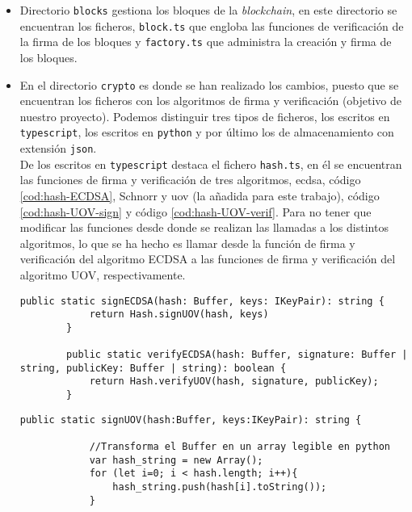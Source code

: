 \begin{itemize}
	\item Directorio \texttt{blocks} gestiona los bloques de la \textit{blockchain}, en este directorio se encuentran los ficheros, \texttt{block.ts} que engloba las funciones de verificación de la firma de los bloques y \texttt{factory.ts} que administra la creación y firma de los bloques.
	\item En el directorio \texttt{crypto} es donde se han realizado los cambios, puesto que se encuentran los ficheros con los algoritmos de firma y verificación (objetivo de nuestro proyecto). Podemos distinguir tres tipos de ficheros, los escritos en \texttt{typescript}, los escritos en \texttt{python} y por último los de almacenamiento con extensión \texttt{json}.\\
	
	De los escritos en \texttt{typescript} destaca el fichero \texttt{hash.ts}, en él se encuentran las funciones de firma y verificación de tres algoritmos, \acrshort{ecdsa}, código \ref{cod:hash-ECDSA}, Schnorr\cite{schnorr} y \acrshort{uov} (la añadida para este trabajo), código \ref{cod:hash-UOV-sign} y código \ref{cod:hash-UOV-verif}. Para no tener que modificar las funciones desde donde se realizan las llamadas a los distintos algoritmos, lo que se ha hecho es llamar desde la función de firma y verificación del algoritmo ECDSA a las funciones de firma y verificación del algoritmo UOV, respectivamente.\\
	
	\begin{lstlisting}[caption=Modificación archivo \texttt{hash.ts} funciones ECDSA, label=cod:hash-ECDSA, style=TypeScript]
		public static signECDSA(hash: Buffer, keys: IKeyPair): string {
			return Hash.signUOV(hash, keys)
		}

		public static verifyECDSA(hash: Buffer, signature: Buffer | string, publicKey: Buffer | string): boolean {
			return Hash.verifyUOV(hash, signature, publicKey);
		}
	\end{lstlisting}
	
	\begin{lstlisting}[caption=Modificación archivo \texttt{hash.ts} función \texttt{signUOV}, label=cod:hash-UOV-sign, style=TypeScript]
		public static signUOV(hash:Buffer, keys:IKeyPair): string {

			//Transforma el Buffer en un array legible en python
			var hash_string = new Array();
			for (let i=0; i < hash.length; i++){
				hash_string.push(hash[i].toString());
			}


\end{lstlisting}
\end{itemize}
